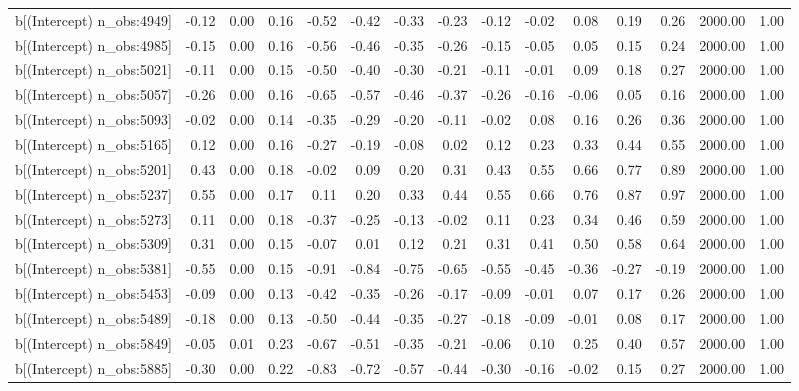 \begin{table}[ht]
\begin{tabular}{rrrrrrrrrrrrrrr}
  b[(Intercept) n\_obs:4949] & -0.12 & 0.00 & 0.16 & -0.52 & -0.42 & -0.33 & -0.23 & -0.12 & -0.02 & 0.08 & 0.19 & 0.26 & 2000.00 & 1.00 \\ 
  b[(Intercept) n\_obs:4985] & -0.15 & 0.00 & 0.16 & -0.56 & -0.46 & -0.35 & -0.26 & -0.15 & -0.05 & 0.05 & 0.15 & 0.24 & 2000.00 & 1.00 \\ 
  b[(Intercept) n\_obs:5021] & -0.11 & 0.00 & 0.15 & -0.50 & -0.40 & -0.30 & -0.21 & -0.11 & -0.01 & 0.09 & 0.18 & 0.27 & 2000.00 & 1.00 \\ 
  b[(Intercept) n\_obs:5057] & -0.26 & 0.00 & 0.16 & -0.65 & -0.57 & -0.46 & -0.37 & -0.26 & -0.16 & -0.06 & 0.05 & 0.16 & 2000.00 & 1.00 \\ 
  b[(Intercept) n\_obs:5093] & -0.02 & 0.00 & 0.14 & -0.35 & -0.29 & -0.20 & -0.11 & -0.02 & 0.08 & 0.16 & 0.26 & 0.36 & 2000.00 & 1.00 \\ 
  b[(Intercept) n\_obs:5165] & 0.12 & 0.00 & 0.16 & -0.27 & -0.19 & -0.08 & 0.02 & 0.12 & 0.23 & 0.33 & 0.44 & 0.55 & 2000.00 & 1.00 \\ 
  b[(Intercept) n\_obs:5201] & 0.43 & 0.00 & 0.18 & -0.02 & 0.09 & 0.20 & 0.31 & 0.43 & 0.55 & 0.66 & 0.77 & 0.89 & 2000.00 & 1.00 \\ 
  b[(Intercept) n\_obs:5237] & 0.55 & 0.00 & 0.17 & 0.11 & 0.20 & 0.33 & 0.44 & 0.55 & 0.66 & 0.76 & 0.87 & 0.97 & 2000.00 & 1.00 \\ 
  b[(Intercept) n\_obs:5273] & 0.11 & 0.00 & 0.18 & -0.37 & -0.25 & -0.13 & -0.02 & 0.11 & 0.23 & 0.34 & 0.46 & 0.59 & 2000.00 & 1.00 \\ 
  b[(Intercept) n\_obs:5309] & 0.31 & 0.00 & 0.15 & -0.07 & 0.01 & 0.12 & 0.21 & 0.31 & 0.41 & 0.50 & 0.58 & 0.64 & 2000.00 & 1.00 \\ 
  b[(Intercept) n\_obs:5381] & -0.55 & 0.00 & 0.15 & -0.91 & -0.84 & -0.75 & -0.65 & -0.55 & -0.45 & -0.36 & -0.27 & -0.19 & 2000.00 & 1.00 \\ 
  b[(Intercept) n\_obs:5453] & -0.09 & 0.00 & 0.13 & -0.42 & -0.35 & -0.26 & -0.17 & -0.09 & -0.01 & 0.07 & 0.17 & 0.26 & 2000.00 & 1.00 \\ 
  b[(Intercept) n\_obs:5489] & -0.18 & 0.00 & 0.13 & -0.50 & -0.44 & -0.35 & -0.27 & -0.18 & -0.09 & -0.01 & 0.08 & 0.17 & 2000.00 & 1.00 \\ 
  b[(Intercept) n\_obs:5849] & -0.05 & 0.01 & 0.23 & -0.67 & -0.51 & -0.35 & -0.21 & -0.06 & 0.10 & 0.25 & 0.40 & 0.57 & 2000.00 & 1.00 \\ 
  b[(Intercept) n\_obs:5885] & -0.30 & 0.00 & 0.22 & -0.83 & -0.72 & -0.57 & -0.44 & -0.30 & -0.16 & -0.02 & 0.15 & 0.27 & 2000.00 & 1.00 \\ 

\end{tabular}
\end{table}
